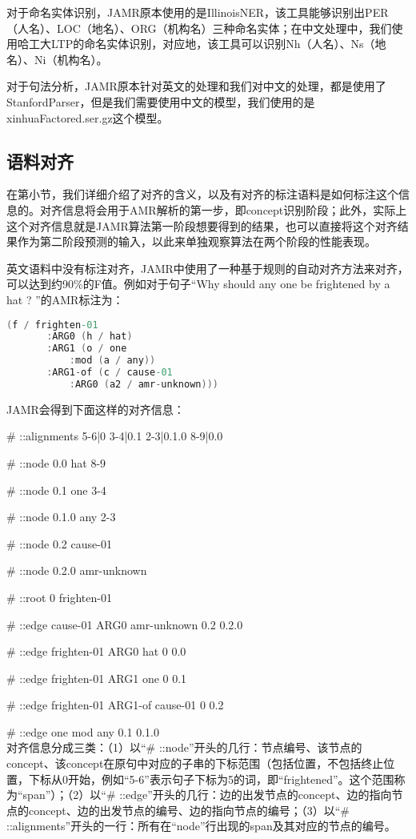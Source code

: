 \documentclass[master, winfont]{njuthesis}
\begin{document}
对于命名实体识别，JAMR原本使用的是IllinoisNER，该工具能够识别出PER（人名）、LOC（地名）、ORG（机构名）三种命名实体；在中文处理中，我们使用哈工大LTP的命名实体识别，对应地，该工具可以识别Nh（人名）、Ns（地名）、Ni（机构名）。

对于句法分析，JAMR原本针对英文的处理和我们对中文的处理，都是使用了StanfordParser，但是我们需要使用中文的模型，我们使用的是xinhuaFactored.ser.gz这个模型。

\subsection{语料对齐}
\label{subsection:dataalign}
在第\label{subsubsection:aligndata}小节，我们详细介绍了对齐的含义，以及有对齐的标注语料是如何标注这个信息的。对齐信息将会用于AMR解析的第一步，即concept识别阶段；此外，实际上这个对齐信息就是JAMR算法第一阶段想要得到的结果，也可以直接将这个对齐结果作为第二阶段预测的输入，以此来单独观察算法在两个阶段的性能表现。

英文语料中没有标注对齐，JAMR中使用了一种基于规则的自动对齐方法来对齐，可以达到约90\%的F值\cite{Flanigan2014}。例如对于句子“Why should any one be frightened by a hat ? ”的AMR标注为：
\begin{lstlisting}[language=C]
   (f / frighten-01
       :ARG0 (h / hat)
       :ARG1 (o / one
           :mod (a / any))
       :ARG1-of (c / cause-01
           :ARG0 (a2 / amr-unknown)))
\end{lstlisting}

JAMR会得到下面这样的对齐信息：\par
\# ::alignments 5-6|0 3-4|0.1 2-3|0.1.0 8-9|0.0 \par
\# ::node	0.0	hat	8-9  \par
\# ::node	0.1	one	3-4  \par
\# ::node	0.1.0	any	2-3  \par
\# ::node	0.2	cause-01	  \par
\# ::node	0.2.0	amr-unknown  \par	
\# ::root	0	frighten-01 \par
\# ::edge	cause-01	ARG0	amr-unknown	0.2	0.2.0	\par
\# ::edge	frighten-01	ARG0	hat	0	0.0	 \par
\# ::edge	frighten-01	ARG1	one	0	0.1	 \par
\# ::edge	frighten-01	ARG1-of	cause-01	0	0.2	 \par
\# ::edge	one	mod	any	0.1	0.1.0	 \\

对齐信息分成三类：（1）以“\# ::node”开头的几行：节点编号、该节点的concept、该concept在原句中对应的子串的下标范围（包括位置，不包括终止位置，下标从0开始，例如“5-6”表示句子下标为5的词，即“frightened”。这个范围称为“span”）；（2）以“\# ::edge”开头的几行：边的出发节点的concept、边的指向节点的concept、边的出发节点的编号、边的指向节点的编号；（3）以“\# ::alignments”开头的一行：所有在“node”行出现的span及其对应的节点的编号。
\end{document}
